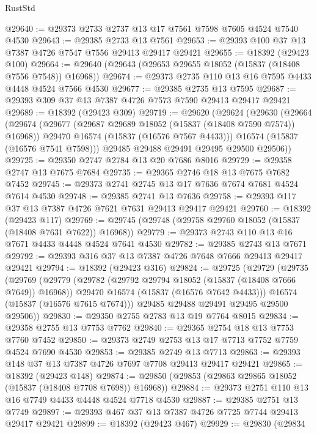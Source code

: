 \begin{lexlean}{RustStd}
\begin{coremodule}
{\begin{coremodule}
{{{{{{{{{{{{{{{{{{{{{{{{{{{{{{{{{{{{{{{{{{{{{{{{{{{{{{{{{{{{@29640 := @29373 @2733 @2737 @13 @17 @7561 @7598 @7605 @4524 @7540 @4530
@29643 := @29385 @2733 @13 @7561
@29653 := @29393 @100 @37 @13 @7387 @4726 @7547 @7556 @29413 @29417 @29421
@29655 := @18392 (@29423 @100)
@29664 := @29640 (@29643 (@29653 @29655 @18052 (@15837 (@18408 @7556 @7548)) @16968))
@29674 := @29373 @2735 @110 @13 @16 @7595 @4433 @4448 @4524 @7566 @4530
@29677 := @29385 @2735 @13 @7595
@29687 := @29393 @309 @37 @13 @7387 @4726 @7573 @7590 @29413 @29417 @29421
@29689 := @18392 (@29423 @309)
@29719 := @29620
    (@29624
      (@29630
        (@29664
          (@29674
            (@29677 (@29687 @29689 @18052 (@15837 (@18408 @7590 @7574)) @16968))
            @29470
            @16574
            (@15837 (@16576 @7567 @4433)))
          @16574
          (@15837 (@16576 @7541 @7598)))
        @29485
        @29488
        @29491
        @29495
        @29500
        @29506))
@29725 := @29350 @2747 @2784 @13 @20 @7686 @8016
@29729 := @29358 @2747 @13 @7675 @7684
@29735 := @29365 @2746 @18 @13 @7675 @7682 @7452
@29745 := @29373 @2741 @2745 @13 @17 @7636 @7674 @7681 @4524 @7614 @4530
@29748 := @29385 @2741 @13 @7636
@29758 := @29393 @117 @37 @13 @7387 @4726 @7621 @7631 @29413 @29417 @29421
@29760 := @18392 (@29423 @117)
@29769 := @29745 (@29748 (@29758 @29760 @18052 (@15837 (@18408 @7631 @7622)) @16968))
@29779 := @29373 @2743 @110 @13 @16 @7671 @4433 @4448 @4524 @7641 @4530
@29782 := @29385 @2743 @13 @7671
@29792 := @29393 @316 @37 @13 @7387 @4726 @7648 @7666 @29413 @29417 @29421
@29794 := @18392 (@29423 @316)
@29824 := @29725
    (@29729
      (@29735
        (@29769
          (@29779
            (@29782 (@29792 @29794 @18052 (@15837 (@18408 @7666 @7649)) @16968))
            @29470
            @16574
            (@15837 (@16576 @7642 @4433)))
          @16574
          (@15837 (@16576 @7615 @7674)))
        @29485
        @29488
        @29491
        @29495
        @29500
        @29506))
@29830 := @29350 @2755 @2783 @13 @19 @7764 @8015
@29834 := @29358 @2755 @13 @7753 @7762
@29840 := @29365 @2754 @18 @13 @7753 @7760 @7452
@29850 := @29373 @2749 @2753 @13 @17 @7713 @7752 @7759 @4524 @7690 @4530
@29853 := @29385 @2749 @13 @7713
@29863 := @29393 @148 @37 @13 @7387 @4726 @7697 @7708 @29413 @29417 @29421
@29865 := @18392 (@29423 @148)
@29874 := @29850 (@29853 (@29863 @29865 @18052 (@15837 (@18408 @7708 @7698)) @16968))
@29884 := @29373 @2751 @110 @13 @16 @7749 @4433 @4448 @4524 @7718 @4530
@29887 := @29385 @2751 @13 @7749
@29897 := @29393 @467 @37 @13 @7387 @4726 @7725 @7744 @29413 @29417 @29421
@29899 := @18392 (@29423 @467)
@29929 := @29830
    (@29834
}}}}}}}}}}}}}}}}}}}}}}}}}}}}}}}}}}}}}}}}}}}}}}}}}}}}}}}}}}}}
\end{coremodule}}
\end{coremodule}
\end{lexlean}

